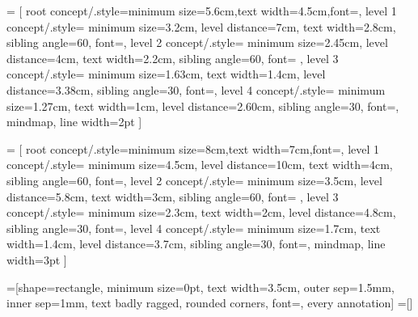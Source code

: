 =
  [%
  root concept/.style={minimum size=5.6cm,text width=4.5cm,font=\pgfutil@font@Large},
  level 1 concept/.style={%
    minimum size=3.2cm,
    level distance=7cm,
    text width=2.8cm,
    sibling angle=60,
    font=},%
  level 2 concept/.style={%
    minimum size=2.45cm,%
    level distance=4cm,%
    text width=2.2cm,%
    sibling angle=60,%
    font=\pgfutil@font@small%
    },%
  level 3 concept/.style={%
    minimum size=1.63cm,%
    text width=1.4cm,%
    level distance=3.38cm,%
    sibling angle=30,%
    font=\pgfutil@font@scriptsize},%
  level 4 concept/.style={%
    minimum size=1.27cm,%
    text width=1cm,
    level distance=2.60cm,%
    sibling angle=30,%
    font=\pgfutil@font@tiny},%
  mindmap,%
  line width=2pt
  ]
  
=
  [%
  root concept/.style={minimum size=8cm,text width=7cm,font=\pgfutil@font@huge},
  level 1 concept/.style={%
    minimum size=4.5cm,
    level distance=10cm,
    text width=4cm,
    sibling angle=60,
    font=\pgfutil@font@large},%
  level 2 concept/.style={%
    minimum size=3.5cm,%
    level distance=5.8cm,%
    text width=3cm,%
    sibling angle=60,%
    font=%
    },%
  level 3 concept/.style={%
    minimum size=2.3cm,%
    text width=2cm,%
    level distance=4.8cm,%
    sibling angle=30,%
    font=\pgfutil@font@footnotesize},%
  level 4 concept/.style={%
    minimum size=1.7cm,%
    text width=1.4cm,
    level distance=3.7cm,%
    sibling angle=30,%
    font=\pgfutil@font@scriptsize},%
  mindmap,%
  line width=3pt
  ]
  


=[shape=rectangle,
                        minimum size=0pt,
                        text width=3.5cm,
                        outer sep=1.5mm,
                        inner sep=1mm,
                        text badly ragged,
                        rounded corners,
                        font=\pgfutil@font@tiny,
                        every annotation]
=[]



\endinput

